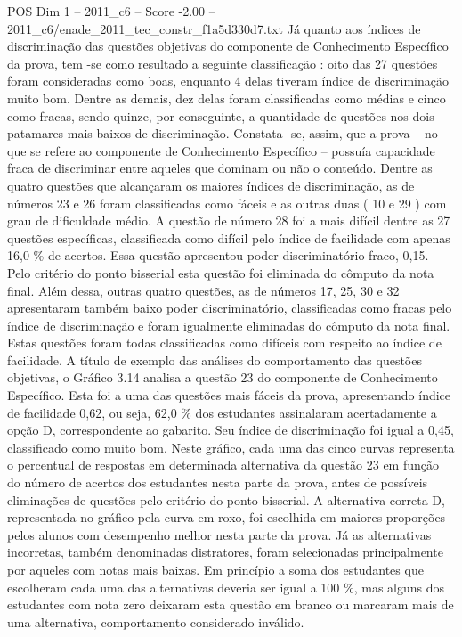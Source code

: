 \begin{textsample}{POS Dim 1 – 2011\_c6 – Score -2.00 – 2011\_c6/enade\_2011\_tec\_constr\_f1a5d330d7.txt}
Já quanto aos índices de discriminação das questões objetivas do componente de Conhecimento Específico da prova, tem -se como resultado a seguinte classificação : oito das 27 questões foram consideradas como boas, enquanto 4 delas tiveram índice de discriminação muito bom.
Dentre as demais, dez delas foram classificadas como médias e cinco como fracas, sendo quinze, por conseguinte, a quantidade de questões nos dois patamares mais baixos de discriminação.
Constata -se, assim, que a prova – no que se refere ao componente de Conhecimento Específico – possuía capacidade fraca de discriminar entre aqueles que dominam ou não o conteúdo.
Dentre as quatro questões que alcançaram os maiores índices de discriminação, as de números 23 e 26 foram classificadas como fáceis e as outras duas ( 10 e 29 ) com grau de dificuldade médio.
A questão de número 28 foi a mais difícil dentre as 27 questões específicas, classificada como difícil pelo índice de facilidade com apenas 16,0 \% de acertos.
Essa questão apresentou poder discriminatório fraco, 0,15.
Pelo critério do ponto bisserial esta questão foi eliminada do cômputo da nota final.
Além dessa, outras quatro questões, as de números 17, 25, 30 e 32 apresentaram também baixo poder discriminatório, classificadas como fracas pelo índice de discriminação e foram igualmente eliminadas do cômputo da nota final.
Estas questões foram todas classificadas como difíceis com respeito ao índice de facilidade.
A título de exemplo das análises do comportamento das questões objetivas, o Gráfico 3.14 analisa a questão 23 do componente de Conhecimento Específico.
Esta foi a uma das questões mais fáceis da prova, apresentando índice de facilidade 0,62, ou seja, 62,0 \% dos estudantes assinalaram acertadamente a opção D, correspondente ao gabarito.
Seu índice de discriminação foi igual a 0,45, classificado como muito bom.
Neste gráfico, cada uma das cinco curvas representa o percentual de respostas em determinada alternativa da questão 23 em função do número de acertos dos estudantes nesta parte da prova, antes de possíveis eliminações de questões pelo critério do ponto bisserial.
A alternativa correta D, representada no gráfico pela curva em roxo, foi escolhida em maiores proporções pelos alunos com desempenho melhor nesta parte da prova.
Já as alternativas incorretas, também denominadas distratores, foram selecionadas principalmente por aqueles com notas mais baixas.
Em princípio a soma dos estudantes que escolheram cada uma das alternativas deveria ser igual a 100 \%, mas alguns dos estudantes com nota zero deixaram esta questão em branco ou marcaram mais de uma alternativa, comportamento considerado inválido.

\end{textsample}
